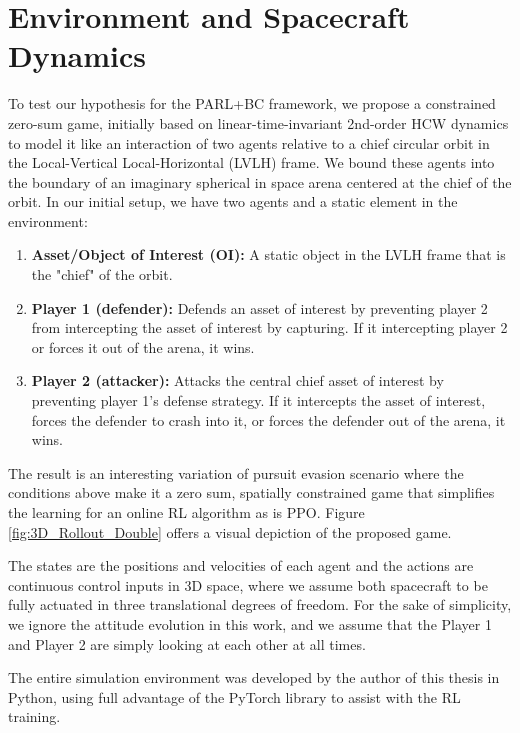 \chapter{Environment and Spacecraft Dynamics}

To test our hypothesis for the PARL+BC framework, we propose a constrained zero-sum game, initially based on linear-time-invariant 2nd-order HCW dynamics to model it like an interaction of two agents relative to a chief circular orbit in the Local-Vertical Local-Horizontal (LVLH) frame. We bound these agents into the boundary of an imaginary spherical in space arena centered at the chief of the orbit. In our initial setup, we have two agents and a static element in the environment:

\begin{enumerate}
\item \textbf{Asset/Object of Interest (OI):} A static object in the LVLH frame that is the "chief" of the orbit. 
\item \textbf{Player 1 (defender):} Defends an asset of interest by preventing player 2 from intercepting the asset of interest by capturing. If it intercepting player 2 or forces it out of the arena, it wins. 
\item \textbf{Player 2 (attacker):} Attacks the central chief asset of interest by preventing player 1's defense strategy. If it intercepts the asset of interest, forces the defender to crash into it, or forces the defender out of the arena, it wins.
\end{enumerate}

The result is an interesting variation of pursuit evasion scenario where the conditions above make it a zero sum, spatially constrained game that simplifies the learning for an online RL algorithm as is  PPO. Figure \ref{fig:3D_Rollout_Double} offers a visual depiction of the proposed game.

The states are the positions and velocities of each agent and the actions are continuous control inputs in 3D space, where we assume both spacecraft to be fully actuated in three translational degrees of freedom. For the sake of simplicity, we ignore the attitude evolution in this work, and we assume that the Player 1 and Player 2 are simply looking  at each other at all times.

The entire simulation environment was developed by the author of this thesis in Python, using full advantage of the PyTorch library to assist with the RL training. 

